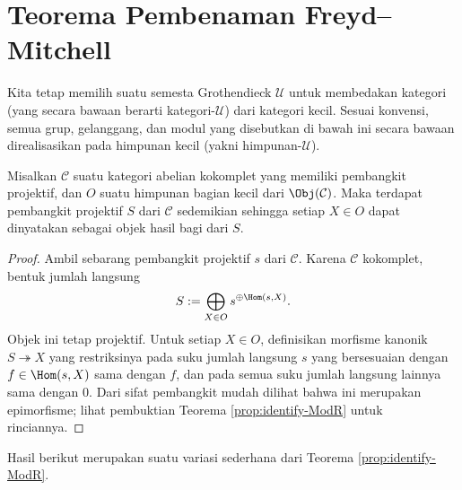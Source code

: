 \section{Teorema Pembenaman Freyd--Mitchell}\label{sec:FM}
Kita tetap memilih suatu semesta Grothendieck $\mathcal{U}$ untuk membedakan kategori (yang secara bawaan berarti kategori-$\mathcal{U}$) dari kategori kecil. Sesuai konvensi, semua grup, gelanggang, dan modul yang disebutkan di bawah ini secara bawaan direalisasikan pada himpunan kecil (yakni himpunan-$\mathcal{U}$).

\begin{lemma}\label{prop:FM-prep-1}
	Misalkan $\mathcal{C}$ suatu kategori abelian kokomplet yang memiliki pembangkit projektif, dan $O$ suatu himpunan bagian kecil dari $\Obj(\mathcal{C})$. Maka terdapat pembangkit projektif $S$ dari $\mathcal{C}$ sedemikian sehingga setiap $X \in O$ dapat dinyatakan sebagai objek hasil bagi dari $S$.
\end{lemma}
\begin{proof}
	Ambil sebarang pembangkit projektif $s$ dari $\mathcal{C}$. Karena $\mathcal{C}$ kokomplet, bentuk jumlah langsung
	\[ S := \bigoplus_{X \in O} s^{\oplus \Hom(s, X)}. \]
	Objek ini tetap projektif. Untuk setiap $X \in O$, definisikan morfisme kanonik $S \twoheadrightarrow X$ yang restriksinya pada suku jumlah langsung $s$ yang bersesuaian dengan $f \in \Hom(s, X)$ sama dengan $f$, dan pada semua suku jumlah langsung lainnya sama dengan $0$. Dari sifat pembangkit mudah dilihat bahwa ini merupakan epimorfisme; lihat pembuktian Teorema \ref{prop:identify-ModR} untuk rinciannya.
\end{proof}

Hasil berikut merupakan suatu variasi sederhana dari Teorema \ref{prop:identify-ModR}.

